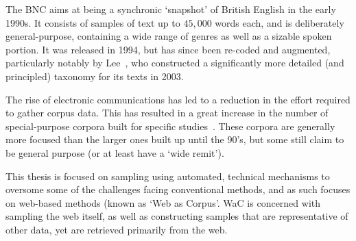The BNC aims at being a synchronic `snapshot' of British English in the early 1990s.  It consists of samples of text up to $45,000$ words each, and is deliberately general-purpose, containing a wide range of genres as well as a sizable spoken portion.  It was released in 1994, but has since been re-coded and augmented, particularly notably by Lee~\cite{lee2003bnc}, who constructed a significantly more detailed (and principled) taxonomy for its texts in 2003.

% 


The rise of electronic communications has led to a reduction in the effort required to gather corpus data.  This has resulted in a great increase in the number of special-purpose corpora built for specific studies~\cite{westlabusenet2013,ferraresi2008introducing}.  These corpora are generally more focused than the larger ones built up until the 90's, but some still claim to be general purpose (or at least have a `wide remit').  


This thesis is focused on sampling using automated, technical mechanisms to oversome some of the challenges facing conventional methods, and as such focuses on web-based methods (known as `Web as Corpus'.  WaC is concerned with sampling the web itself, as well as constructing samples that are representative of other data, yet are retrieved primarily from the web.






















